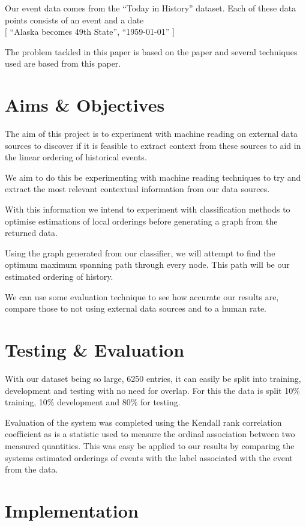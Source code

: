 \documentclass[bsc,frontabs,twoside,singlespacing,parskip,deptreport]{infthesis}     %
\begin{document}
Our event data comes from the ``Today in History'' dataset. Each of these data points consists
of an event and a date\\
$[$ ``Alaska becomes 49th State'', ``1959-01-01'' $]$


The problem tackled in this paper is based on the paper \cite{abend2015lexical} and several
techniques used are based from this paper. 

\section{Aims \& Objectives}

The aim of this project is to experiment with machine reading on external data sources to
discover if it is feasible to extract context from these sources to aid in the linear ordering
of historical events.

We aim to do this be experimenting with machine reading techniques to try and extract the most
relevant contextual information from our data sources.

With this information we intend to experiment with classification methods to optimise estimations
of local orderings before generating a graph from the returned data.

Using the graph generated from our classifier, we will attempt to find the optimum maximum spanning path
through every node. This path will be our estimated ordering of history.

We can use some evaluation technique to see how accurate our results are, compare those to not using
external data sources and to a human rate.


\section{Testing \& Evaluation}
With our dataset being so large, 6250 entries, it can
easily be split into training, development and testing with no
need for overlap. For this the data is split 10\% training,
10\% development and 80\% for testing.

Evaluation of the system was completed using the
Kendall rank correlation coefficient as is a statistic
used to measure the ordinal association between two
measured quantities. This was easy be applied to our results
by comparing the systems estimated orderings of events
with the label associated with the event from the data.

\section{Implementation}
\end{document}
